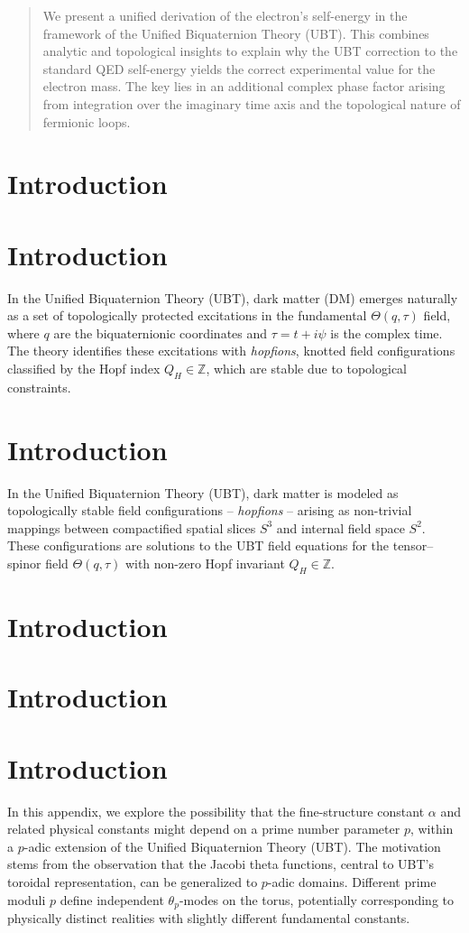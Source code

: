 \documentclass[12pt,a4paper]{article}
\numberwithin{equation}{section}
\theoremstyle{definition}
\theoremstyle{remark}
\begin{document}
\begin{abstract}
We present a unified derivation of the electron's self-energy in the framework of the Unified Biquaternion Theory (UBT). This combines analytic and topological insights to explain why the UBT correction to the standard QED self-energy yields the correct experimental value for the electron mass. The key lies in an additional complex phase factor arising from integration over the imaginary time axis and the topological nature of fermionic loops.
\end{abstract}

\section{Introduction}
\section{Introduction}
In the Unified Biquaternion Theory (UBT), dark matter (DM) emerges naturally as a set of topologically protected excitations in the fundamental $\Theta(q,\tau)$ field, where $q$ are the biquaternionic coordinates and $\tau = t + i\psi$ is the complex time. The theory identifies these excitations with \emph{hopfions}, knotted field configurations classified by the Hopf index $Q_H \in \mathbb{Z}$, which are stable due to topological constraints.

\section*{Introduction}
In the Unified Biquaternion Theory (UBT), dark matter is modeled as topologically stable field configurations – \emph{hopfions} – arising as non-trivial mappings between compactified spatial slices \(S^3\) and internal field space \(S^2\). These configurations are solutions to the UBT field equations for the tensor–spinor field \(\Theta(q,\tau)\) with non-zero Hopf invariant \(Q_H \in \mathbb{Z}\).

\section*{Introduction}

\section{Introduction}

\section{Introduction}
In this appendix, we explore the possibility that the fine-structure constant $\alpha$ and related physical constants might depend on a prime number parameter $p$, within a $p$-adic extension of the Unified Biquaternion Theory (UBT).
The motivation stems from the observation that the Jacobi theta functions, central to UBT's toroidal representation, can be generalized to $p$-adic domains.
Different prime moduli $p$ define independent $\theta_p$-modes on the torus, potentially corresponding to physically distinct realities with slightly different fundamental constants.
\end{document}
